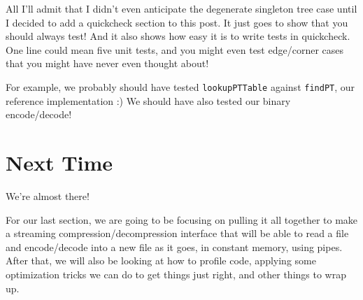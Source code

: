 \documentclass[]{article}
\begin{document}
All I'll admit that I didn't even anticipate the degenerate singleton tree case
until I decided to add a quickcheck section to this post. It just goes to show
that you should always test! And it also shows how easy it is to write tests in
quickcheck. One line could mean five unit tests, and you might even test
edge/corner cases that you might have never even thought about!

For example, we probably should have tested \texttt{lookupPTTable} against
\texttt{findPT}, our reference implementation :) We should have also tested our
binary encode/decode!

\section{Next Time}

We're almost there!

For our last section, we are going to be focusing on pulling it all together to
make a streaming compression/decompression interface that will be able to read a
file and encode/decode into a new file as it goes, in constant memory, using
pipes. After that, we will also be looking at how to profile code, applying some
optimization tricks we can do to get things just right, and other things to wrap
up.
\end{document}
